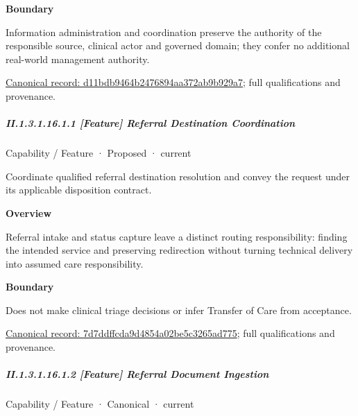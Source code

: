 \textbf{Boundary}



Information administration and coordination preserve the authority of the responsible source, clinical actor and governed domain; they confer no additional real-world management authority.


{\footnotesize \href{../../../../continuum/strategy/capability/d11bdb9464b2476894aa372ab9b929a7.md}{Canonical record: d11bdb9464b2476894aa372ab9b929a7}; full qualifications and provenance.}\par
\subparagraph*{II.1.3.1.16.1.1 [Feature] Referral Destination Coordination}
\label{navigation:II.1.3.1.16.1.1}

\label{element:7d7ddffcda9d4854a02be5c3265ad775}
{\small Capability / Feature · Proposed · current}\par

Coordinate qualified referral destination resolution and convey the request under its applicable disposition contract.



\textbf{Overview}



Referral intake and status capture leave a distinct routing responsibility: finding the intended service and preserving redirection without turning technical delivery into assumed care responsibility.



\textbf{Boundary}



Does not make clinical triage decisions or infer Transfer of Care from acceptance.


{\footnotesize \href{../../../../continuum/strategy/capability/feature/7d7ddffcda9d4854a02be5c3265ad775.md}{Canonical record: 7d7ddffcda9d4854a02be5c3265ad775}; full qualifications and provenance.}\par
\subparagraph*{II.1.3.1.16.1.2 [Feature] Referral Document Ingestion}
\label{navigation:II.1.3.1.16.1.2}

\label{element:1d1c5f8e8ca1498fb68dba601a7079dc}
{\small Capability / Feature · Canonical · current}\par

